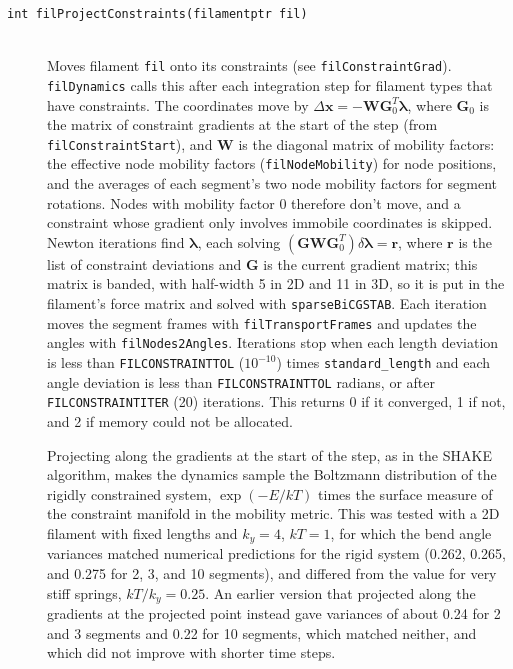 \documentclass {scrbook}
\newcommand {\ttt} {\texttt}
\begin{document}
\begin{description}
\item[\ttt{int filProjectConstraints(filamentptr fil)}]
\hfill \\
Moves filament \ttt{fil} onto its constraints (see \ttt{filConstraintGrad}). \ttt{filDynamics} calls this after each integration step for filament types that have constraints. The coordinates move by $\Delta\bm{x}=-\bm{W}\bm{G}_0^T\bm{\lambda}$, where $\bm{G}_0$ is the matrix of constraint gradients at the start of the step (from \ttt{filConstraintStart}), and $\bm{W}$ is the diagonal matrix of mobility factors: the effective node mobility factors (\ttt{filNodeMobility}) for node positions, and the averages of each segment's two node mobility factors for segment rotations. Nodes with mobility factor 0 therefore don't move, and a constraint whose gradient only involves immobile coordinates is skipped. Newton iterations find $\bm{\lambda}$, each solving $(\bm{G}\bm{W}\bm{G}_0^T)\delta\bm{\lambda}=\bm{r}$, where $\bm{r}$ is the list of constraint deviations and $\bm{G}$ is the current gradient matrix; this matrix is banded, with half-width 5 in 2D and 11 in 3D, so it is put in the filament's force matrix and solved with \ttt{sparseBiCGSTAB}. Each iteration moves the segment frames with \ttt{filTransportFrames} and updates the angles with \ttt{filNodes2Angles}. Iterations stop when each length deviation is less than \ttt{FILCONSTRAINTTOL} ($10^{-10}$) times \ttt{standard\_length} and each angle deviation is less than \ttt{FILCONSTRAINTTOL} radians, or after \ttt{FILCONSTRAINTITER} (20) iterations. This returns 0 if it converged, 1 if not, and 2 if memory could not be allocated.

Projecting along the gradients at the start of the step, as in the SHAKE algorithm, makes the dynamics sample the Boltzmann distribution of the rigidly constrained system, $\exp(-E/kT)$ times the surface measure of the constraint manifold in the mobility metric. This was tested with a 2D filament with fixed lengths and $k_y=4$, $kT=1$, for which the bend angle variances matched numerical predictions for the rigid system (0.262, 0.265, and 0.275 for 2, 3, and 10 segments), and differed from the value for very stiff springs, $kT/k_y=0.25$. An earlier version that projected along the gradients at the projected point instead gave variances of about 0.24 for 2 and 3 segments and 0.22 for 10 segments, which matched neither, and which did not improve with shorter time steps.


\end{description}
\end{document}
